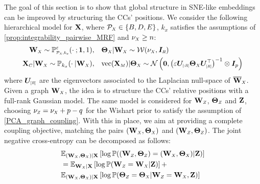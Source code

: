 The goal of this section is to show that global structure in SNE-like embeddings can be improved by structuring the CCs' positions. We consider the following hierarchical model for $\mathbf{X}$, where $\mathcal{P}_{\scaleto{X}{4pt}} \in \{B,D,E\}$, $k_x$ satisfies the assumptions of \cref{prop:integrability_pairwise_MRF} and $\nu_{\scaleto{X}{4pt}} \geq n$:
\begin{align*}
    \Wb_{\scaleto{X}{4pt}} \sim \mathbb{P}_{\scaleto{\mathcal{P}_{\scaleto{X}{3pt}},k_x}{5pt}}^{\varepsilon}(\cdot \: ; \bm{1},1), &\quad \bm{\Theta}_{\scaleto{X}{4pt}} | \Wb_{\scaleto{X}{4pt}} \sim \mathcal{W}(\nu_{\scaleto{X}{4pt}}, \bm{I}_{\scaleto{R}{4pt}}) \\
    \Xb_{\scaleto{C}{4pt}} |\Wb_{\scaleto{X}{4pt}} \sim \mathbb{P}_{k_x}(\cdot \:| \Wb_{\scaleto{X}{4pt}}), &\quad \mathrm{vec}(\Xb_{\scaleto{M}{4pt}}) | \bm{\Theta}_{\scaleto{X}{4pt}} \sim \mathcal{N}\left(\bm{0}, \left(\varepsilon \bm{U}_{\scaleto{[:R]}{5pt}}  \bm{\Theta}_{\scaleto{X}{4pt}}\bm{U}^\top_{\scaleto{[R]}{5pt}}\right)^{-1} \otimes \bm{I}_p\right)
\end{align*}
where $\bm{U}_{\scaleto{[R]}{5pt}}$ are the eigenvectors associated to the Laplacian null-space of $\overline{\Wb}_{\scaleto{X}{4pt}}$. Given a graph $\Wb_{\scaleto{X}{4pt}}$, the idea is to structure the CCs' relative positions with a full-rank Gaussian model.
The same model is considered for $\Wb_{\scaleto{Z}{4pt}}$, $\bm{\Theta}_{\scaleto{Z}{4pt}}$ and $\mathbf{Z}$, choosing $\nu_{\scaleto{Z}{4pt}} = \nu_{\scaleto{X}{4pt}} + p - q$ for the Wishart prior to satisfy the assumption of \cref{PCA_graph_coupling}.  With this in place, we aim at providing a complete coupling objective, matching the pairs  $(\Wb_{\scaleto{X}{4pt}},\bm{\Theta}_{\scaleto{X}{4pt}})$ and  $(\Wb_{\scaleto{Z}{4pt}},\bm{\Theta}_{\scaleto{Z}{4pt}})$. The joint negative cross-entropy can be decomposed as follows:
\begin{align}
    &\mathbb{E}_{(\Wb_{\scaleto{X}{3pt}}, \bm{\Theta}_{\scaleto{X}{3pt}})|\Xb}\left[\log \mathbb{P}((\Wb_{\scaleto{Z}{4pt}},\bm{\Theta}_{\scaleto{Z}{4pt}}) = (\Wb_{\scaleto{X}{4pt}},\bm{\Theta}_{\scaleto{X}{4pt}}) | \Zb)\right] \nonumber\\
    &= \mathbb{E}_{\Wb_{\scaleto{X}{3pt}}|\Xb}\left[\log \mathbb{P}(\Wb_{\scaleto{Z}{4pt}} = \Wb_{\scaleto{X}{4pt}} | \Zb)\right] + \label{eq:loss_LW} \\
    & \mathbb{E}_{(\Wb_{\scaleto{X}{3pt}},\bm{\Theta}_{\scaleto{X}{3pt}})|\Xb}\left[ \log \mathbb{P}(\bm{\Theta}_{\scaleto{Z}{4pt}} = \bm{\Theta}_{\scaleto{X}{4pt}}| \Wb_{\scaleto{Z}{4pt}} = \Wb_{\scaleto{X}{4pt}}, \Zb) \right] \label{eq:add_term_Coupling}
\end{align}
